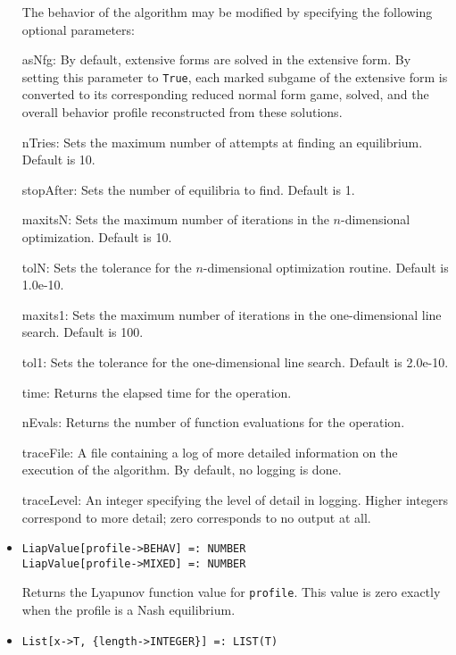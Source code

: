 \begin{itemize}
The behavior of the algorithm may be modified by specifying the following
optional parameters:
\bd
\item
[asNfg:] By default, extensive forms are solved in the extensive form.
By setting this parameter to \verb+True+, each marked subgame of the
extensive form is converted to its corresponding reduced normal form game,
solved, and the overall behavior profile reconstructed from these
solutions.
\item
[nTries:] Sets the maximum number of attempts at finding an
equilibrium. Default is 10.
\item
[stopAfter:] Sets the number of equilibria to find.  Default is 1.
\item
[maxitsN:] Sets the maximum number of iterations in the
$n$-dimensional optimization.  Default is 10.
\item
[tolN:] Sets the tolerance for the $n$-dimensional optimization
routine.  Default is 1.0e-10.
\item
[maxits1:] Sets the maximum number of iterations in the
one-dimensional line search.  Default is 100.
\item
[tol1:] Sets the tolerance for the one-dimensional line search.
Default is 2.0e-10.
\item
[time:] Returns the elapsed time for the operation.
\item
[nEvals:] Returns the number of function evaluations for the operation.
\item
[traceFile:] A file containing a log of more detailed information on the
execution of the algorithm.  By default, no logging is done.
\item
[traceLevel:] An integer specifying the level of detail in logging.
Higher integers correspond to more detail; zero corresponds to no output
at all.
\ed
\ed

\item{}
\protect \large \begin{verbatim}
LiapValue[profile->BEHAV] =: NUMBER 
LiapValue[profile->MIXED] =: NUMBER 
\end{verbatim} \normalsize

\bd 
Returns the Lyapunov function value for \verb+profile+.
This value is zero exactly when the
profile is a Nash equilibrium.
\ed

\item{}
\protect \large \begin{verbatim}
List[x->T, {length->INTEGER}] =: LIST(T)
\end{verbatim}\normalsize


\end{itemize}
